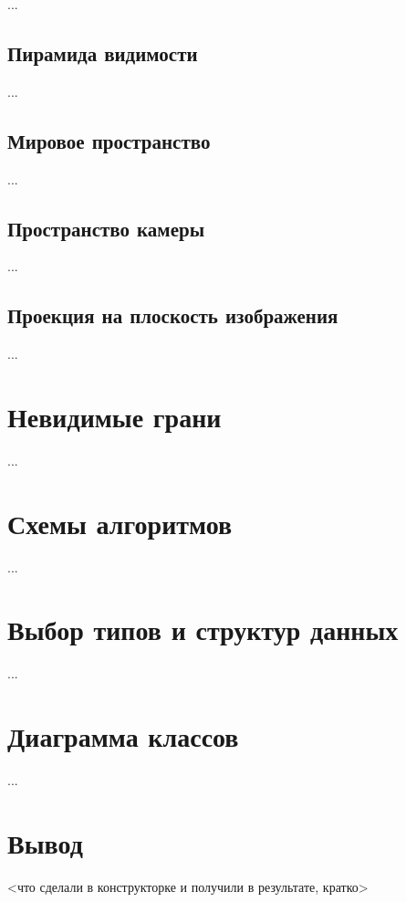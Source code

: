 ...

\subsection{Пирамида видимости}

...

\subsection{Мировое пространство}

...

\subsection{Пространство камеры}

...

\subsection{Проекция на плоскость изображения}

...

\section{Невидимые грани}

...

\section{Схемы алгоритмов}

...

\section{Выбор типов и структур данных}

...

\section{Диаграмма классов}

...

\section{Вывод}

<что сделали в конструкторке и получили в результате, кратко>

\clearpage
